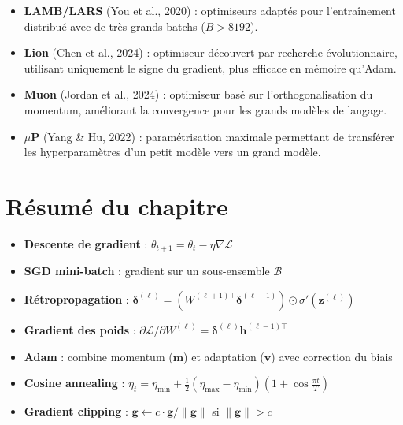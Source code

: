 \begin{sota}
\begin{itemize}
\item \textbf{LAMB/LARS} (You et al., 2020) : optimiseurs adapt\'es pour l'entra\^inement distribu\'e avec de tr\`es grands batchs ($B > 8192$).
\item \textbf{Lion} (Chen et al., 2024) : optimiseur d\'ecouvert par recherche \'evolutionnaire, utilisant uniquement le signe du gradient, plus efficace en m\'emoire qu'Adam.
\item \textbf{Muon} (Jordan et al., 2024) : optimiseur bas\'e sur l'orthogonalisation du momentum, am\'eliorant la convergence pour les grands mod\`eles de langage.
\item \textbf{$\mu$P} (Yang \& Hu, 2022) : param\'etrisation maximale permettant de transf\'erer les hyperparamètres d'un petit mod\`ele vers un grand mod\`ele.
\end{itemize}
\end{sota}

\section{R\'esum\'e du chapitre}

\begin{formules}
\begin{itemize}
\item \textbf{Descente de gradient} : $\theta_{t+1} = \theta_t - \eta \nabla \mathcal{L}$
\item \textbf{SGD mini-batch} : gradient sur un sous-ensemble $\mathcal{B}$
\item \textbf{R\'etropropagation} : $\bm{\delta}^{(\ell)} = (W^{(\ell+1)\top}\bm{\delta}^{(\ell+1)}) \odot \sigma'(\bm{z}^{(\ell)})$
\item \textbf{Gradient des poids} : $\partial\mathcal{L}/\partial W^{(\ell)} = \bm{\delta}^{(\ell)} \bm{h}^{(\ell-1)\top}$
\item \textbf{Adam} : combine momentum ($\bm{m}$) et adaptation ($\bm{v}$) avec correction du biais
\item \textbf{Cosine annealing} : $\eta_t = \eta_{\min} + \frac{1}{2}(\eta_{\max}-\eta_{\min})(1+\cos\frac{\pi t}{T})$
\item \textbf{Gradient clipping} : $\bm{g} \leftarrow c \cdot \bm{g}/\|\bm{g}\|$ si $\|\bm{g}\| > c$
\end{itemize}
\end{formules}

